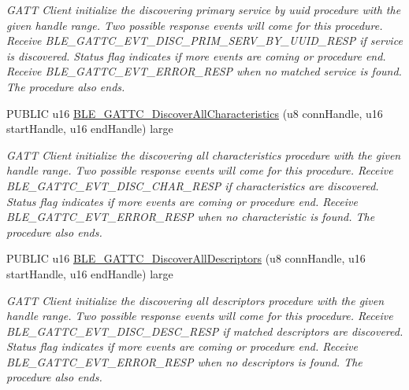 \begin{DoxyCompactItemize}
\begin{DoxyCompactList}\small\item\em G\+A\+TT Client initialize the discovering primary service by uuid procedure with the given handle range. Two possible response events will come for this procedure. Receive B\+L\+E\+\_\+\+G\+A\+T\+T\+C\+\_\+\+E\+V\+T\+\_\+\+D\+I\+S\+C\+\_\+\+P\+R\+I\+M\+\_\+\+S\+E\+R\+V\+\_\+\+B\+Y\+\_\+\+U\+U\+I\+D\+\_\+\+R\+E\+SP if service is discovered. Status flag indicates if more events are coming or procedure end. Receive B\+L\+E\+\_\+\+G\+A\+T\+T\+C\+\_\+\+E\+V\+T\+\_\+\+E\+R\+R\+O\+R\+\_\+\+R\+E\+SP when no matched service is found. The procedure also ends. \end{DoxyCompactList}\item 
P\+U\+B\+L\+IC u16 \hyperlink{group___b_l_e___g_a_t_t_ga78d040ae3a72af1c93499bad90f185dc}{B\+L\+E\+\_\+\+G\+A\+T\+T\+C\+\_\+\+Discover\+All\+Characteristics} (u8 conn\+Handle, u16 start\+Handle, u16 end\+Handle) large
\begin{DoxyCompactList}\small\item\em G\+A\+TT Client initialize the discovering all characteristics procedure with the given handle range. Two possible response events will come for this procedure. Receive B\+L\+E\+\_\+\+G\+A\+T\+T\+C\+\_\+\+E\+V\+T\+\_\+\+D\+I\+S\+C\+\_\+\+C\+H\+A\+R\+\_\+\+R\+E\+SP if characteristics are discovered. Status flag indicates if more events are coming or procedure end. Receive B\+L\+E\+\_\+\+G\+A\+T\+T\+C\+\_\+\+E\+V\+T\+\_\+\+E\+R\+R\+O\+R\+\_\+\+R\+E\+SP when no characteristic is found. The procedure also ends. \end{DoxyCompactList}\item 
P\+U\+B\+L\+IC u16 \hyperlink{group___b_l_e___g_a_t_t_gab5b7400900819b84b5391555d8a5bc3e}{B\+L\+E\+\_\+\+G\+A\+T\+T\+C\+\_\+\+Discover\+All\+Descriptors} (u8 conn\+Handle, u16 start\+Handle, u16 end\+Handle) large
\begin{DoxyCompactList}\small\item\em G\+A\+TT Client initialize the discovering all descriptors procedure with the given handle range. Two possible response events will come for this procedure. Receive B\+L\+E\+\_\+\+G\+A\+T\+T\+C\+\_\+\+E\+V\+T\+\_\+\+D\+I\+S\+C\+\_\+\+D\+E\+S\+C\+\_\+\+R\+E\+SP if matched descriptors are discovered. Status flag indicates if more events are coming or procedure end. Receive B\+L\+E\+\_\+\+G\+A\+T\+T\+C\+\_\+\+E\+V\+T\+\_\+\+E\+R\+R\+O\+R\+\_\+\+R\+E\+SP when no descriptors is found. The procedure also ends. \end{DoxyCompactList}\item 

\end{DoxyCompactItemize}
